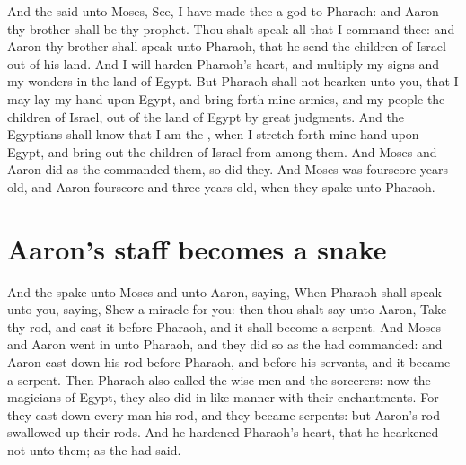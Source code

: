 \begin{biblechapter} %
\verse And the \LORD said unto Moses, See, I have made thee a god to Pharaoh: and Aaron thy brother shall be thy prophet.
\verse Thou shalt speak all that I command thee: and Aaron thy brother shall speak unto Pharaoh, that he send the children of Israel out of his land.
\verse And I will harden Pharaoh's heart, and multiply my signs and my wonders in the land of Egypt.
\verse But Pharaoh shall not hearken unto you, that I may lay my hand upon Egypt, and bring forth mine armies, and my people the children of Israel, out of the land of Egypt by great judgments.
\verse And the Egyptians shall know that I am the \LORD, when I stretch forth mine hand upon Egypt, and bring out the children of Israel from among them.
\verse And Moses and Aaron did as the \LORD commanded them, so did they.
\verse And Moses was fourscore years old, and Aaron fourscore and three years old, when they spake unto Pharaoh.
\section*{Aaron's staff becomes a snake}
\verse And the \LORD spake unto Moses and unto Aaron, saying,
\verse When Pharaoh shall speak unto you, saying, Shew a miracle for you: then thou shalt say unto Aaron, Take thy rod, and cast it before Pharaoh, and it shall become a serpent.
\verse And Moses and Aaron went in unto Pharaoh, and they did so as the \LORD had commanded: and Aaron cast down his rod before Pharaoh, and before his servants, and it became a serpent.
\verse Then Pharaoh also called the wise men and the sorcerers: now the magicians of Egypt, they also did in like manner with their enchantments.
\verse For they cast down every man his rod, and they became serpents: but Aaron's rod swallowed up their rods.
\verse And he hardened Pharaoh's heart, that he hearkened not unto them; as the \LORD had said.

\end{biblechapter}
